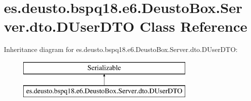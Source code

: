 \hypertarget{classes_1_1deusto_1_1bspq18_1_1e6_1_1_deusto_box_1_1_server_1_1dto_1_1_d_user_d_t_o}{}\section{es.\+deusto.\+bspq18.\+e6.\+Deusto\+Box.\+Server.\+dto.\+D\+User\+D\+TO Class Reference}
\label{classes_1_1deusto_1_1bspq18_1_1e6_1_1_deusto_box_1_1_server_1_1dto_1_1_d_user_d_t_o}
Inheritance diagram for es.\+deusto.\+bspq18.\+e6.\+Deusto\+Box.\+Server.\+dto.\+D\+User\+D\+TO\+:\begin{figure}[H]
\begin{center}
\leavevmode
\includegraphics[height=2.000000cm]{classes_1_1deusto_1_1bspq18_1_1e6_1_1_deusto_box_1_1_server_1_1dto_1_1_d_user_d_t_o}
\end{center}
\end{figure}
